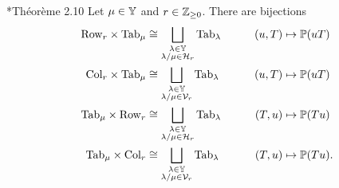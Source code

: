 \documentclass{ert-l} %
\begin{document}
\begin{proposition} \label{P:Pieri} \cite{MR646486}*{Th\'eor\`eme 2.10}
Let $\mu\in\mathbb{Y}$ and $r\in\mathbb{Z}_{\ge0}$.
There are bijections
\begin{align}
\label{E:left row Pieri}
  \mathrm{Row}_r \times \mathrm{Tab}_\mu &\cong \bigsqcup_{\substack{\lambda\in\mathbb{Y} \\ \lambda/\mu\in\mathcal{H}_r}} \mathrm{Tab}_\lambda &\qquad (u, T) &\mapsto \mathbb{P}(uT) \\
\label{E:left column Pieri}
  \mathrm{Col}_r \times \mathrm{Tab}_\mu &\cong \bigsqcup_{\substack{\lambda\in\mathbb{Y} \\ \lambda/\mu\in\mathcal{V}_r}} \mathrm{Tab}_\lambda &  (u, T) &\mapsto \mathbb{P}(uT) \\
  \label{E:right row Pieri}
 \mathrm{Tab}_\mu\times \mathrm{Row}_r &\cong \bigsqcup_{\substack{\lambda\in\mathbb{Y} \\ \lambda/\mu\in\mathcal{H}_r}} \mathrm{Tab}_\lambda &  (T,u) &\mapsto \mathbb{P}(Tu) \\
 \label{E:right column Pieri}
   \mathrm{Tab}_\mu\times \mathrm{Col}_r &\cong \bigsqcup_{\substack{\lambda\in\mathbb{Y} \\ \lambda/\mu\in\mathcal{V}_r}} \mathrm{Tab}_\lambda &  (T,u) &\mapsto \mathbb{P}(Tu).
\end{align}
\end{proposition}
\end{document}
